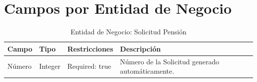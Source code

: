 \section{Campos por Entidad de Negocio} \label{sec:entity-fields}

\begin{table}[h]
	\caption{Entidad de Negocio: Solicitud Pensión}
	\label{tab:fields-solicitudpension}
	\begin{center}
	\begin{tabular}{ l l l l }
		\hline
		\textbf{Campo} & \textbf{Tipo} & \textbf{Restricciones} & \textbf{Descripción} \\
		\hline
		Número & Integer & Required: true & Número de la Solicitud generado automáticamente. \\
		\hline
	\end{tabular}
	\end{center}
\end{table}
